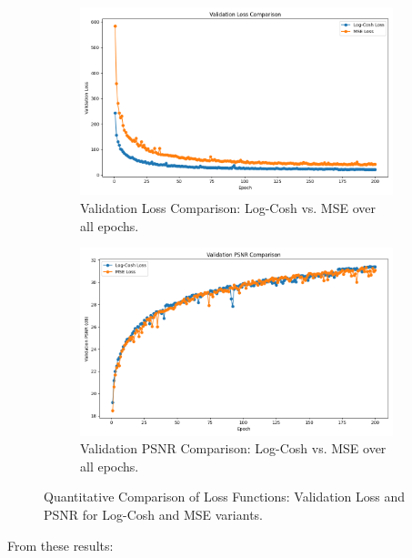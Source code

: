 \begin{figure}[htbp]
    \centering
    \begin{subfigure}[b]{0.49\textwidth}
        \includegraphics[width=\textwidth]{img/vae_results/val_loss_comparison.png}
        \caption{Validation Loss Comparison: Log-Cosh vs. MSE over all epochs.}
        \label{fig:val_loss_comparison}
    \end{subfigure}
    \hfill
    \begin{subfigure}[b]{0.49\textwidth}
        \includegraphics[width=\textwidth]{img/vae_results/val_psnr_comparison.png}
        \caption{Validation PSNR Comparison: Log-Cosh vs. MSE over all epochs.}
        \label{fig:val_psnr_comparison}
    \end{subfigure}
    
    \caption{Quantitative Comparison of Loss Functions: Validation Loss and PSNR for Log-Cosh and MSE variants.}
    \label{fig:quant_comparison}
\end{figure}


From these results:


